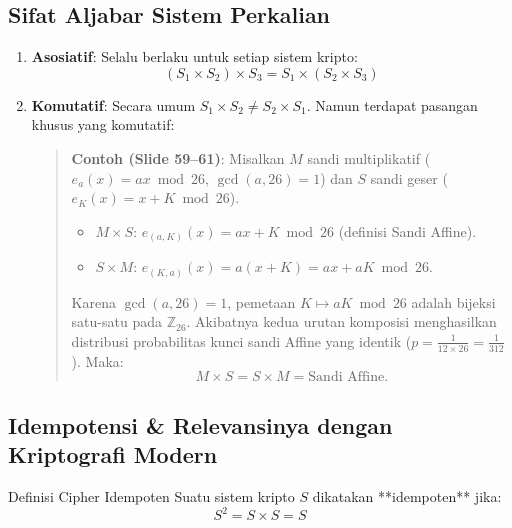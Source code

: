 \documentclass[11pt,a4paper]{article}
\begin{document}
\subsection{Sifat Aljabar Sistem Perkalian}
\begin{enumerate}[leftmargin=*]
    \item \textbf{Asosiatif}: Selalu berlaku untuk setiap sistem kripto:
    \begin{equation}
    (S_1 \times S_2) \times S_3 = S_1 \times (S_2 \times S_3)
    \end{equation}
    \item \textbf{Komutatif}: Secara umum $S_1 \times S_2 \neq S_2 \times S_1$. Namun terdapat pasangan khusus yang komutatif:
    \begin{quote}
    \textbf{Contoh (Slide 59--61)}: Misalkan $M$ sandi multiplikatif ($e_a(x) = ax \bmod 26$, $\gcd(a,26)=1$) dan $S$ sandi geser ($e_K(x) = x + K \bmod 26$).
    \begin{itemize}
        \item $M \times S$: $e_{(a, K)}(x) = ax + K \bmod 26$ (definisi Sandi Affine).
        \item $S \times M$: $e_{(K, a)}(x) = a(x + K) = ax + aK \bmod 26$.
    \end{itemize}
    Karena $\gcd(a, 26) = 1$, pemetaan $K \mapsto aK \bmod 26$ adalah bijeksi satu-satu pada $\mathbb{Z}_{26}$. Akibatnya kedua urutan komposisi menghasilkan distribusi probabilitas kunci sandi Affine yang identik ($p = \frac{1}{12 \times 26} = \frac{1}{312}$). Maka:
    \begin{equation}
    M \times S = S \times M = \text{Sandi Affine}.
    \end{equation}
    \end{quote}
\end{enumerate}

\subsection{Idempotensi \& Relevansinya dengan Kriptografi Modern}

\begin{conceptbox}{Definisi Cipher Idempoten}
Suatu sistem kripto $S$ dikatakan **idempoten** jika:
\begin{equation}
\label{eq:idempotent}
S^2 = S \times S = S
\end{equation}
\end{conceptbox}
\end{document}
